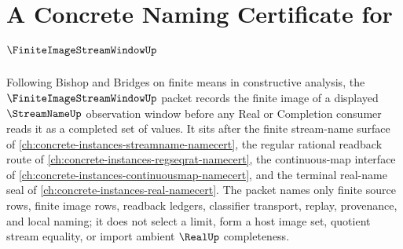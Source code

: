 \chapter{A Concrete Naming Certificate for $\FiniteImageStreamWindowUp$}
\label{ch:concrete-instances-finite-image-stream-window-namecert}

Following Bishop and Bridges on finite means in constructive analysis, the $\FiniteImageStreamWindowUp$ packet records the finite image of a displayed $\StreamNameUp$ observation window before any Real or Completion consumer reads it as a completed set of values. It sits after the finite stream-name surface of \autoref{ch:concrete-instances-streamname-namecert}, the regular rational readback route of \autoref{ch:concrete-instances-regseqrat-namecert}, the continuous-map interface of \autoref{ch:concrete-instances-continuousmap-namecert}, and the terminal real-name seal of \autoref{ch:concrete-instances-real-namecert}. The packet names only finite source rows, finite image rows, readback ledgers, classifier transport, replay, provenance, and local naming; it does not select a limit, form a host image set, quotient stream equality, or import ambient $\RealUp$ completeness.

